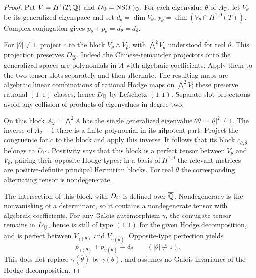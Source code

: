 \begin{proof}
Put \(V=H^1(T,\mathbb Q)\) and \(D_\mathbb Q=\operatorname{NS}(T)_\mathbb Q\).  For each eigenvalue
\(\theta\) of \(A_\mathbb C\), let \(V_\theta\) be its generalized eigenspace and set
\(d_\theta=\dim V_\theta\), \(p_\theta=\dim(V_\theta\cap H^{1,0}(T))\).
Complex conjugation gives
\(p_\theta+p_{\overline\theta}=d_\theta=d_{\overline\theta}\).

For \(|\theta|\ne1\), project \(c\) to the block
\(V_\theta\wedge V_{\overline\theta}\), with \(\bigwedge^2V_\theta\) understood for
real \(\theta\).  This projection preserves \(D_{\overline{\mathbb Q}}\).  Indeed
the Chinese-remainder projectors onto the generalized spaces are
polynomials in \(A\) with algebraic coefficients.  Apply them to the
two tensor slots separately and then alternate.  The resulting maps are
algebraic linear combinations of rational Hodge maps on \(\bigwedge^2V\);
these preserve rational \((1,1)\) classes, hence \(D_\mathbb Q\) by Lefschetz
\((1,1)\).  Separate slot projections avoid any collision of products of
eigenvalues in degree two.

On this block \(A_2=\bigwedge^2 A\) has the single generalized
eigenvalue \(\theta\overline\theta=|\theta|^2\ne1\).  The inverse of \(A_2-1\)
there is a finite polynomial in its nilpotent part.  Project the congruence
for \(c\) to the block and apply this inverse.  It follows that its block
\(c_{\theta,\overline\theta}\) belongs to \(D_\mathbb C\).  Positivity says that this
block is a perfect tensor between \(V_\theta\) and \(V_{\overline\theta}\),
pairing their opposite Hodge types: in a basis of \(H^{1,0}\) the relevant
matrices are positive-definite principal Hermitian blocks.  For real
\(\theta\) the corresponding alternating tensor is nondegenerate.

The intersection of this block with \(D_\mathbb C\) is defined over
\(\overline{\mathbb Q}\).  Nondegeneracy is the nonvanishing of a determinant,
so it contains a nondegenerate tensor with algebraic coefficients.  For
any Galois automorphism \(\gamma\), the conjugate tensor remains in
\(D_{\overline{\mathbb Q}}\), hence is still of type \((1,1)\) for the given
Hodge decomposition, and is perfect between \(V_{\gamma(\theta)}\) and
\(V_{\gamma(\overline\theta)}\).  Opposite-type perfection yields
\begin{equation}\label{floor:torus-hodge-count}
 p_{\gamma(\theta)}+p_{\gamma(\overline\theta)}
       =d_\theta\qquad(|\theta|\ne1).
\end{equation}
This does not replace \(\gamma(\overline\theta)\) by
\(\overline{\gamma(\theta)}\), and assumes no Galois invariance of the Hodge
decomposition.


\end{proof}

